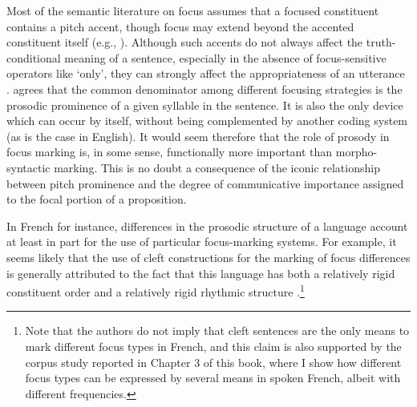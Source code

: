 Most of the semantic literature on focus assumes that a focused constituent contains a pitch accent, though focus may extend beyond the accented constituent itself (e.g., \cite{jackendoff1972semantic, selkirk2008contrastive}). Although such accents do not always affect the truth-conditional meaning of a sentence, especially in the absence of focus-sensitive operators like `only', they can strongly affect the appropriateness of an utterance \parencite{horn1981exhaustiveness, beaver2009sense}. \textcite{lambrecht1996information} agrees that the common denominator among different focusing strategies is the prosodic prominence of a given syllable in the sentence. It is also the only device which can occur by itself, without being complemented by another coding system (as is the case in English). It would seem therefore that the role of prosody in focus marking is, in some sense, functionally more important than morpho-syntactic marking. This is no doubt a consequence of the iconic relationship between pitch prominence and the degree of communicative importance assigned to the focal portion of a proposition. 

In French for instance, differences in the prosodic structure of a language account at least in part for the use of particular focus-marking systems. For example, it seems likely that the use of cleft constructions for the marking of focus differences is generally attributed to the fact that this language has both a relatively rigid constituent order and a relatively rigid rhythmic structure \parencite{dufter2003rhythmic}.\footnote{Note that the authors do not imply that cleft sentences are the only means to mark different focus types in French, and this claim is also supported by the corpus study reported in Chapter 3 of this book, where I show how different focus types can be expressed by several means in spoken French, albeit with different frequencies.}


